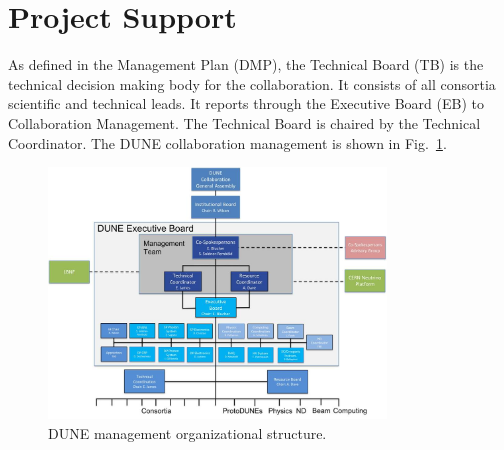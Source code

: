 \section{Project Support}
\label{sec:fdsp-coord-supp}

As defined in the  Management Plan (DMP), the 
Technical Board (TB) is the technical decision making body for the
collaboration. It consists of all consortia scientific and technical
leads. It reports through the Executive Board (EB) to Collaboration
Management. The  Technical Board is chaired by the
Technical Coordinator. The DUNE collaboration management is shown in
Fig.~\ref{fig:DUNE_org}.
\begin{figure}[htb]
  \begin{center}
    \includegraphics[width=0.8\textwidth]{far-detector-generic/figures/DUNE_mgmt}
    \caption{DUNE management organizational structure.}
    \label{fig:DUNE_org}
  \end{center}
\end{figure}



